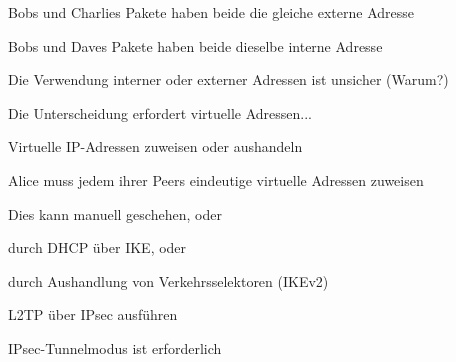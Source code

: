 \documentclass[a4paper]{article}
\begin{document}
\begin{multicols}{3}
\begin{itemize*}
\begin{itemize*}
                  \begin{itemize*}
                        \item Bobs und Charlies Pakete haben beide die gleiche externe Adresse
                        \item Bobs und Daves Pakete haben beide dieselbe interne Adresse
                        \item Die Verwendung interner oder externer Adressen ist unsicher (Warum?)
                        \item Die Unterscheidung erfordert virtuelle Adressen...
                  \end{itemize*}
                  \item
                  Virtuelle IP-Adressen zuweisen oder aushandeln

                  \begin{itemize*}
                        \item Alice muss jedem ihrer Peers eindeutige virtuelle Adressen zuweisen
                        \item Dies kann manuell geschehen, oder
                        \item durch DHCP über IKE, oder
                        \item durch Aushandlung von Verkehrsselektoren (IKEv2)
                        \item L2TP über IPsec ausführen
                  \end{itemize*}
                  \item
                  IPsec-Tunnelmodus ist erforderlich


\end{itemize*}
\end{itemize*}
\end{multicols}
\end{document}
